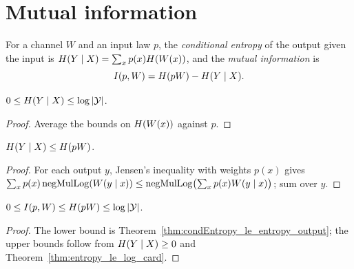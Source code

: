 \chapter{Mutual information}
\label{chap:mutual_information}

\begin{definition}
  \label{def:mutualInfo}
  \leanok
  For a channel $W$ and an input law $p$, the \emph{conditional entropy} of the output given the
  input is $H(Y \mid X) = \sum_x p(x) H(W(x))$, and the \emph{mutual information} is
  \[
    I(p, W) = H(pW) - H(Y \mid X).
  \]
\end{definition}

\begin{lemma}
  \label{lem:condEntropy_bounds}
  \leanok
  $0 \le H(Y \mid X) \le \log|\mathcal Y|$.
\end{lemma}
\begin{proof}
  \leanok
  Average the bounds on $H(W(x))$ against $p$.
\end{proof}

\begin{theorem}
  \label{thm:condEntropy_le_entropy_output}
  \leanok
  $H(Y \mid X) \le H(pW)$.
\end{theorem}
\begin{proof}
  \leanok
  For each output $y$, Jensen's inequality with weights $p(x)$ gives
  $\sum_x p(x) \operatorname{negMulLog}(W(y \mid x)) \le \operatorname{negMulLog}\bigl(\sum_x p(x) W(y \mid x)\bigr)$; sum over $y$.
\end{proof}

\begin{theorem}
  \label{thm:mutualInfo_nonneg}
  \leanok
  $0 \le I(p, W) \le H(pW) \le \log|\mathcal Y|$.
\end{theorem}
\begin{proof}
  \leanok
  The lower bound is Theorem~\ref{thm:condEntropy_le_entropy_output}; the upper bounds follow from
  $H(Y \mid X) \ge 0$ and Theorem~\ref{thm:entropy_le_log_card}.
\end{proof}

